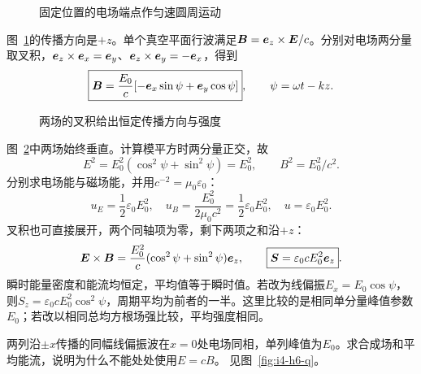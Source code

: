 \begin{figure}[H]\centering
{}
\caption{固定位置的电场端点作匀速圆周运动}\label{fig:i4-h5-q}
\end{figure}
\begin{solution}
图~\ref{fig:i4-h5-q}的传播方向是$+z$。单个真空平面行波满足$\bm{B}=\bm{e}_z\times\bm{E}/c$。分别对电场两分量取叉积，$\bm{e}_z\times\bm{e}_x=\bm{e}_y$、$\bm{e}_z\times\bm{e}_y=-\bm{e}_x$，得到
\[
\boxed{\bm{B}=\frac{E_0}{c}
[-\bm{e}_x\sin\psi+\bm{e}_y\cos\psi]},\qquad
\psi=\omega t-kz.
\]
\begin{figure}[H]\centering
{}
\caption{两场的叉积给出恒定传播方向与强度}\label{fig:i4-h5-s}
\end{figure}
图~\ref{fig:i4-h5-s}中两场始终垂直。计算模平方时两分量正交，故
\[
E^2=E_0^2(\cos^2\psi+\sin^2\psi)=E_0^2,\qquad
B^2=E_0^2/c^2.
\]
分别求电场能与磁场能，并用$c^{-2}=\mu_0\varepsilon_0$：
\[
u_E=\frac12\varepsilon_0E_0^2,\quad
u_B=\frac{E_0^2}{2\mu_0c^2}
=\frac12\varepsilon_0E_0^2,\quad
\boxed{u=\varepsilon_0E_0^2}.
\]
叉积也可直接展开，两个同轴项为零，剩下两项之和沿$+z$：
\[
\bm{E}\times\bm{B}=\frac{E_0^2}{c}
(\cos^2\psi+\sin^2\psi)\bm{e}_z,\qquad
\boxed{\bm{S}=\varepsilon_0cE_0^2\bm{e}_z}.
\]
瞬时能量密度和能流均恒定，平均值等于瞬时值。若改为线偏振$E_x=E_0\cos\psi$，则$S_z=\varepsilon_0cE_0^2\cos^2\psi$，周期平均为前者的一半。这里比较的是相同单分量峰值参数$E_0$；若改以相同总均方根场强比较，平均强度相同。
\end{solution}

\begin{exercise}[驻波中电场与磁场是否同相]\label{ex:i4-h6}
两列沿$\pm x$传播的同幅线偏振波在$x=0$处电场同相，单列峰值为$E_0$。求合成场和平均能流，说明为什么不能处处使用$E=cB$。 见图~\ref{fig:i4-h6-q}。
\end{exercise}

